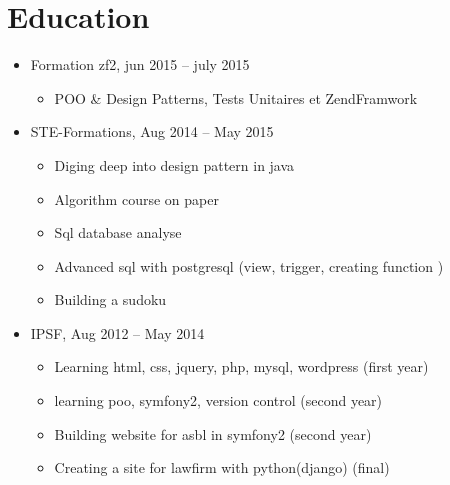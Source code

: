 \documentclass[11pt,letter,sans]{moderncv}
\begin{document}
\section{Education}
  \begin{itemize}
      \item Formation zf2, \hfill jun 2015 -- july 2015
      \begin{itemize}
\item POO & Design Patterns, Tests Unitaires et ZendFramwork\end{itemize}
      \item STE-Formations, \hfill Aug 2014 -- May 2015
      \begin{itemize}
\item Diging deep into design pattern in java\item Algorithm course on paper\item Sql database analyse\item Advanced sql with postgresql (view, trigger, creating function )\item Building a sudoku\end{itemize}
      \item IPSF, \hfill Aug 2012 -- May 2014
      \begin{itemize}
\item Learning html, css, jquery, php, mysql, wordpress (first year)\item learning poo, symfony2, version control (second year)\item Building website for asbl in symfony2 (second year)\item Creating a site for lawfirm with python(django) (final)\end{itemize}
  \end{itemize}
\end{document}
